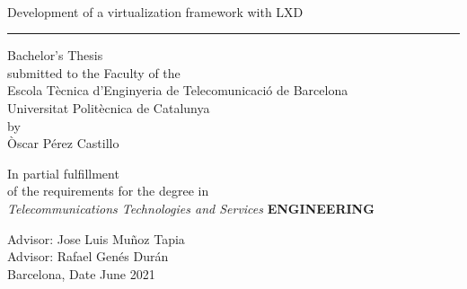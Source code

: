 \thispagestyle{empty}
\begin{center}
    {\sffamily
        \\
        \vspace{1cm}
        {\Huge Development of a virtualization framework with LXD}\\
        \vspace{0.5cm}
        {\color{black}\hrule height 1pt}
        \vspace{1cm}
        {\large{Bachelor's Thesis \\
		submitted to the Faculty of the \\
                Escola T\`ecnica d'Enginyeria de Telecomunicaci\'o de Barcelona \\
                Universitat Polit\`ecnica de Catalunya \\
                by \\
                \vspace{0.5cm}
                Òscar Pérez Castillo}}

        \vspace{1.5cm}

        {In partial fulfillment\\
            of the requirements for the degree in\\
            \textit{Telecommunications Technologies and Services} \textbf{ENGINEERING}}

        \vspace{2cm}

        {{Advisor: Jose Luis Muñoz Tapia\\}}
        {{Advisor: Rafael Genés Durán\\}}
        {{Barcelona, Date June 2021}}

        \vspace{2cm}

        \thispagestyle{alim}
    }

\end{center}
